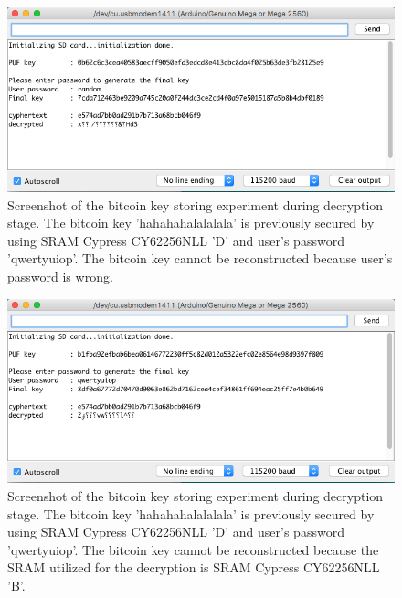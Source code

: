 \begin{figure}[tph!]
    \centerline{\includegraphics[width={\textwidth}]{images/D_decrypt_wrong_password}}
    \caption{Screenshot of the bitcoin key storing experiment during decryption stage. The bitcoin key 'hahahahalalalala' is previously secured by using SRAM Cypress CY62256NLL 'D' and user's password 'qwertyuiop'.
    The bitcoin key cannot be reconstructed because user's password is wrong.}
    \label{fig:D_decrypt_wrong_password}
\end{figure}

\begin{figure}[tph!]
    \centerline{\includegraphics[width={\textwidth}]{images/D_decrypt_wrong_SRAM_B}}
    \caption{Screenshot of the bitcoin key storing experiment during decryption stage. The bitcoin key 'hahahahalalalala' is previously secured by using SRAM Cypress CY62256NLL 'D' and user's password 'qwertyuiop'.
    The bitcoin key cannot be reconstructed because the SRAM utilized for the decryption is SRAM Cypress CY62256NLL 'B'.}
    \label{fig:D_decrypt_wrong_SRAM}
\end{figure}

